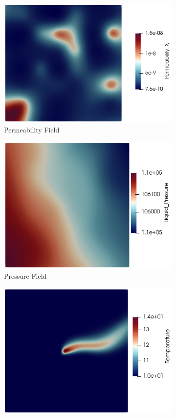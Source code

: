 \documentclass{article} %
\begin{document}
\begin{figure}[!htb]
\centering
\begin{subfigure}{.33\textwidth}
  \centering
  \includegraphics[width=.8\linewidth]{perm_example.png}
  \caption{Permeability Field}
  \label{fig:sub1_perm}
\end{subfigure}%
\begin{subfigure}{.33\textwidth}
  \centering
  \includegraphics[width=.8\linewidth]{pressure_example.png}
  \caption{Pressure Field}
  \label{fig:sub1_pressure}
\end{subfigure}
\begin{subfigure}{.33\textwidth}
  \centering
  \includegraphics[width=.8\linewidth]{temp_example.png}

\end{subfigure}
\end{figure}
\end{document}
